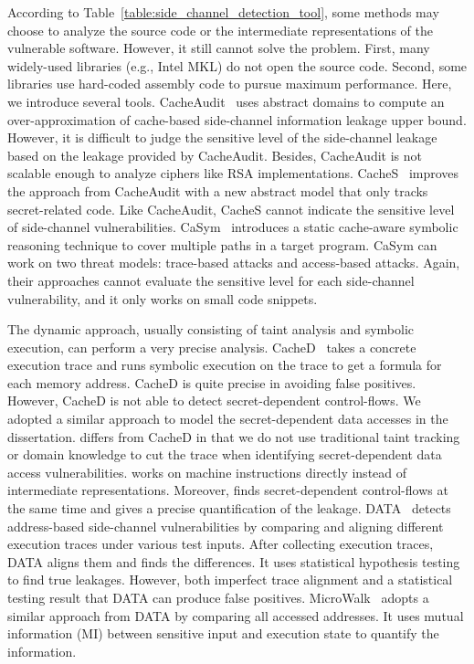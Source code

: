 According to Table~\ref{table:side_channel_detection_tool}, some methods may choose to analyze the source code or the intermediate representations of the vulnerable software. However, it still cannot solve the problem. First, many widely-used libraries (e.g., Intel MKL) do not open the source code. Second, some libraries use hard-coded assembly code to pursue maximum performance.
Here, we introduce several tools. CacheAudit~\cite{182946} uses abstract domains to compute an
over-approximation of cache-based side-channel information leakage upper bound.
However, it is difficult to judge the sensitive level of the side-channel leakage based on the leakage provided by CacheAudit. Besides, CacheAudit is not scalable enough to analyze ciphers like RSA implementations. CacheS~\cite{236338} improves the approach from
CacheAudit with a new abstract model that only tracks
secret-related code. Like CacheAudit, CacheS cannot
indicate the sensitive level of side-channel vulnerabilities.
CaSym~\cite{Brotzman19Casym} introduces a static cache-aware symbolic reasoning technique to cover multiple paths in a target program. CaSym can work on two threat models: trace-based attacks and access-based attacks. Again, their
approaches cannot evaluate the sensitive level for each side-channel vulnerability, and it only works on small code snippets.

The dynamic approach, usually consisting of taint analysis and symbolic execution,
can perform a very precise analysis. CacheD~\cite{203878} takes a concrete execution trace and runs symbolic execution on the trace
to get a formula for each memory address. CacheD is
quite precise in avoiding false positives. However, CacheD is not able to detect secret-dependent control-flows. We adopted a similar approach to model the secret-dependent data accesses in the dissertation. \tool{} differs from CacheD in that we do not use traditional taint tracking or domain knowledge to cut the trace when identifying secret-dependent data access vulnerabilities. \tool{} works on machine instructions directly instead of intermediate representations. Moreover, \tool{} finds secret-dependent control-flows at the same time and gives a precise quantification of the leakage. DATA~\cite{217537} detects address-based side-channel vulnerabilities by comparing and aligning different execution traces under various test inputs. After collecting execution traces, DATA aligns them and finds the differences. It uses statistical hypothesis testing to find true leakages. However, both imperfect trace alignment and a statistical testing result that DATA can produce false positives.
MicroWalk~\cite{Wichelmann:2018:MFF:3274694.3274741} adopts a similar approach from DATA by comparing all accessed addresses. It uses mutual information (MI) between sensitive input and execution state to quantify the information. 

